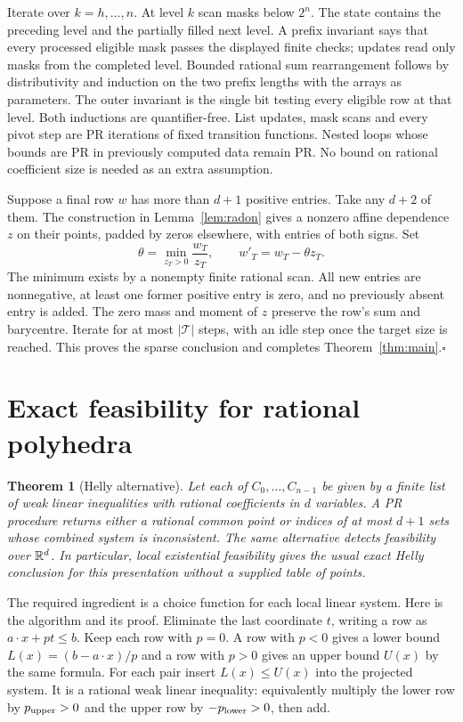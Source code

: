 \documentclass[11pt,letterpaper]{article}
\newcommand{\key}[1]{\smallskip\noindent{\sffamily\bfseries\color{ink}#1}\enspace}
\theoremstyle{packet}\newtheorem{theorem}{Theorem}\newtheorem{lem}[theorem]{Lemma}
\newcommand{\head}[1]{\section{#1}}
\begin{document}
\key{Induction audit.} Iterate over $k=h,\ldots,n$. At level $k$ scan masks below $2^n$. The state contains the preceding level and the partially filled next level. A prefix invariant says that every processed eligible mask passes the displayed finite checks; updates read only masks from the completed level. Bounded rational sum rearrangement follows by distributivity and induction on the two prefix lengths with the arrays as parameters. The outer invariant is the single bit testing every eligible row at that level. Both inductions are quantifier-free. List updates, mask scans and every pivot step are PR iterations of fixed transition functions. Nested loops whose bounds are PR in previously computed data remain PR. No bound on rational coefficient size is needed as an extra assumption.

\key{Compressing the proof of membership.} Suppose a final row $w$ has more than $d+1$ positive entries. Take any $d+2$ of them. The construction in Lemma~\ref{lem:radon} gives a nonzero affine dependence $z$ on their points, padded by zeros elsewhere, with entries of both signs. Set
\[
 \theta=\min_{z_T>0}\frac{w_T}{z_T},\qquad w'_T=w_T-\theta z_T.
\]
The minimum exists by a nonempty finite rational scan. All new entries are nonnegative, at least one former positive entry is zero, and no previously absent entry is added. The zero mass and moment of $z$ preserve the row's sum and barycentre. Iterate for at most $|\mathcal T|$ steps, with an idle step once the target size is reached. This proves the sparse conclusion and completes Theorem~\ref{thm:main}.\hfill$\square$

\newpage
\head{Exact feasibility for rational polyhedra}\label{sec:poly}

\begin{theorem}[Helly alternative]\label{thm:poly}
Let each of $C_0,\ldots,C_{n-1}$ be given by a finite list of weak linear inequalities with rational coefficients in $d$ variables. A PR procedure returns either a rational common point or indices of at most $d+1$ sets whose combined system is inconsistent. The same alternative detects feasibility over $\mathbb R^d$. In particular, local existential feasibility gives the usual exact Helly conclusion for this presentation without a supplied table of points.
\end{theorem}

The required ingredient is a choice function for each local linear system. Here is the algorithm and its proof. Eliminate the last coordinate $t$, writing a row as $a\cdot x+pt\le b$. Keep each row with $p=0$. A row with $p<0$ gives a lower bound $L(x)=(b-a\cdot x)/p$ and a row with $p>0$ gives an upper bound $U(x)$ by the same formula. For each pair insert $L(x)\le U(x)$ into the projected system. It is a rational weak linear inequality: equivalently multiply the lower row by $p_{\rm upper}>0$ and the upper row by $-p_{\rm lower}>0$, then add.
\end{document}
